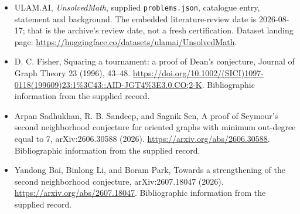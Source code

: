 \documentclass[11pt,a4paper]{article}
\begin{document}
{\small

\begin{itemize}

\item[\hypertarget{source:statement:1}{S1}] ULAM.AI, \emph{UnsolvedMath}, supplied \texttt{problems.json}, catalogue entry, statement and background. The embedded literature-review date is 2026-08-17; that is the archive’s review date, not a fresh certification. Dataset landing page: \url{https://huggingface.co/datasets/ulamai/UnsolvedMath}.

\item[\hypertarget{source:statement:2}{S2}] D. C. Fisher, Squaring a tournament: a proof of Dean's conjecture, Journal of Graph Theory 23 (1996), 43–48. \url{https://doi.org/10.1002/(SICI)1097-0118(199609)23:1%3C43::AID-JGT4%3E3.0.CO;2-K}. Bibliographic information from the supplied record.

\item[\hypertarget{source:statement:3}{S3}] Arpan Sadhukhan, R. B. Sandeep, and Sagnik Sen, A proof of Seymour's second neighborhood conjecture for oriented graphs with minimum out-degree equal to 7, arXiv:2606.30588 (2026). \url{https://arxiv.org/abs/2606.30588}. Bibliographic information from the supplied record.

\item[\hypertarget{source:statement:4}{S4}] Yandong Bai, Binlong Li, and Boram Park, Towards a strengthening of the second neighborhood conjecture, arXiv:2607.18047 (2026). \url{https://arxiv.org/abs/2607.18047}. Bibliographic information from the supplied record.

\end{itemize}

}

\label{end:statement}
\end{document}
